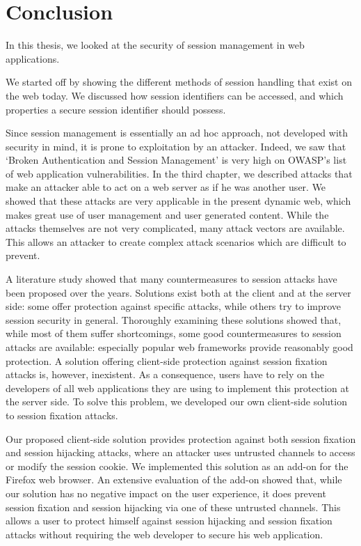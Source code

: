 \chapter{Conclusion}

In this thesis, we looked at the security of session management in web applications.

We started off by showing the different methods of session handling that exist on the web today. We discussed how session identifiers can be accessed, and which properties a secure session identifier should possess.

Since session management is essentially an ad hoc approach, not developed with security in mind, it is prone to exploitation by an attacker. Indeed, we saw that `Broken Authentication and Session Management' is very high on OWASP's list of web application vulnerabilities. In the third chapter, we described attacks that make an attacker able to act on a web server as if he was another user. We showed that these attacks are very applicable in the present dynamic web, which makes great use of user management and user generated content. While the attacks themselves are not very complicated, many attack vectors are available. This allows an attacker to create complex attack scenarios which are difficult to prevent.

A literature study showed that many countermeasures to session attacks have been proposed over the years. Solutions exist both at the client and at the server side: some offer protection against specific attacks, while others try to improve session security in general. Thoroughly examining these solutions showed that, while most of them suffer shortcomings, some good countermeasures to session attacks are available: especially popular web frameworks provide reasonably good protection. A solution offering client-side protection against session fixation attacks is, however, inexistent. As a consequence, users have to rely on the developers of all web applications they are using to implement this protection at the server side. To solve this problem, we developed our own client-side solution to session fixation attacks.

Our proposed client-side solution provides protection against both session fixation and session hijacking attacks, where an attacker uses untrusted channels to access or modify the session cookie. We implemented this solution as an add-on for the Firefox web browser. An extensive evaluation of the add-on showed that, while our solution has no negative impact on the user experience, it does prevent session fixation and session hijacking via one of these untrusted channels. This allows a user to protect himself against session hijacking and session fixation attacks without requiring the web developer to secure his web application.
